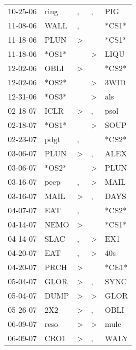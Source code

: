 \begin{supertabular}{lllll}
 10-25-06 &   ring &                , &                , &    PIG \\
 11-08-06 &   WALL &                , &                  &  *CS1* \\
 11-18-06 &   PLUN &     \textgreater &                  &  *CS1* \\
 11-18-06 &  *OS1* &                  &     \textgreater &   LIQU \\
 12-02-06 &   OBLI &     \textgreater &                  &  *CS2* \\
 12-02-06 &  *OS2* &                  &     \textgreater &   3WID \\
 12-31-06 &  *OS3* &                  &     \textgreater &    als \\
 02-18-07 &   ICLR &     \textgreater &                , &   psol \\
 02-18-07 &  *OS1* &                  &     \textgreater &   SOUP \\
 02-23-07 &   pdgt &                , &                  &  *CS2* \\
 03-06-07 &   PLUN &     \textgreater &                , &   ALEX \\
 03-06-07 &  *OS2* &                  &     \textgreater &   PLUN \\
 03-16-07 &   peep &                , &     \textgreater &   MAIL \\
 03-16-07 &   MAIL &     \textgreater &                , &   DAYS \\
 04-07-07 &    EAT &                , &                  &  *CS2* \\
 04-14-07 &   NEMO &     \textgreater &                  &  *CS1* \\
 04-14-07 &   SLAC &                , &     \textgreater &    EX1 \\
 04-20-07 &    EAT &                , &     \textgreater &    40s \\
 04-20-07 &   PRCH &     \textgreater &                  &  *CE1* \\
 05-04-07 &   GLOR &     \textgreater &                , &   SYNC \\
 05-04-07 &   DUMP &     \textgreater &     \textgreater &   GLOR \\
 05-26-07 &    2X2 &     \textgreater &                , &   OBLI \\
 06-09-07 &   reso &     \textgreater &     \textgreater &   mulc \\
 06-09-07 &   CRO1 &     \textgreater &                , &   WALY \\

\end{supertabular}
